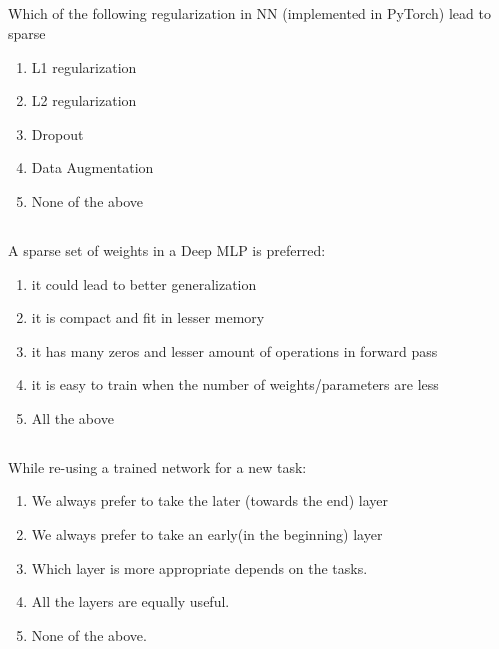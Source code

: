 \begin{frame}
\section{}
Which of the following regularization in NN (implemented in PyTorch) lead to sparse
\begin{enumerate}[label=(\Alph*)]
\item L1 regularization   %
\item L2 regularization
\item Dropout   %
\item Data Augmentation
\item None of the above  %
\end{enumerate}
\end{frame}


\begin{frame}
\section{}
A sparse set of weights in a Deep MLP is preferred:
\begin{enumerate}[label=(\Alph*)]
  \item it could lead to better generalization    %
  \item it is compact and fit in lesser memory    %
  \item it has many zeros and lesser amount of operations in forward pass   %
  \item it is easy to train when the number of weights/parameters are less    %
  \item All the above  %
\end{enumerate}
\end{frame}



\begin{frame}
\section{}
While re-using a trained network for a new task:
\begin{enumerate}[label=(\Alph*)]
\item We always prefer to take the later (towards the end) layer
\item We always prefer to take an early(in the beginning) layer   %
\item Which layer is more appropriate depends on the tasks.
\item All the layers are equally useful.
\item None of the above.  %
\end{enumerate}
\end{frame}



